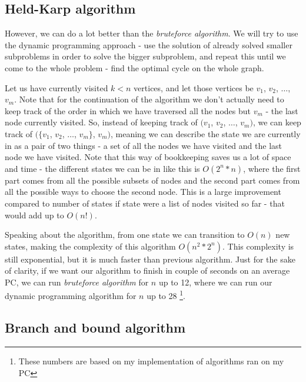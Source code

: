 \documentclass[12pt,twoside,notitlepage]{report}
\begin{document}
\subsection{Held-Karp algorithm} %

However, we can do a lot better than the {\it bruteforce algorithm}. We will try to use the dynamic programming approach - use the solution of already solved smaller subproblems in order to solve the bigger subproblem, and repeat this until we come to the whole problem - find the optimal cycle on the whole graph. 

\smallskip

Let us have currently visited $k < n$ vertices, and let those vertices be $v_{1}$, $v_{2}$, $\dots$, $v_{m}$. Note that for the continuation of the algorithm we don't actually need to keep track of the order in which we have traversed all the nodes but $v_{m}$ - the last node currently visited. So, instead of keeping track of $(v_{1}$, $v_{2}$, $\dots$, $v_{m})$, we can keep track of $(\{v_{1}$, $v_{2}$, $\dots$, $v_{m}\}$, $v_{m})$, meaning we can describe the state we are currently in as a pair of two things - a set of all the nodes we have visited and the last node we have visited. Note that this way of bookkeeping saves us a lot of space and time - the different states we can be in like this is $O(2^{n} * n)$, where the first part comes from all the possible subsets of nodes and the second part comes from all the possible ways to choose the second node. This is a large improvement compared to number of states if state were a list of nodes visited so far - that would add up to $O(n!)$.

\smallskip

Speaking about the algorithm, from one state we can transition to $O(n)$ new states, making the complexity of this algorithm $O(n^2 * 2^n)$. This complexity is still exponential, but it is much faster than previous algorithm. Just for the sake of clarity, if we want our algorithm to finish in couple of seconds on an average PC, we can run {\it bruteforce algorithm} for $n$ up to 12, where we can run our dynamic programming algorithm for $n$ up to 28 \footnote{These numbers are based on my implementation of algorithms ran on my PC}.

\subsection{Branch and bound algorithm}
\end{document}
